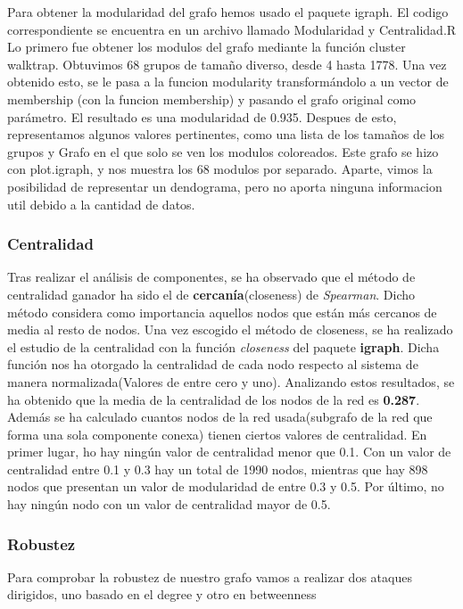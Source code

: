Para obtener la modularidad del grafo hemos usado el paquete igraph. El codigo correspondiente se encuentra en un archivo llamado Modularidad y Centralidad.R
Lo primero fue obtener los modulos del grafo mediante la función cluster walktrap. Obtuvimos 68 grupos de tamaño diverso, desde 4 hasta 1778. Una vez obtenido esto, se le pasa a la funcion modularity transformándolo a un vector de membership (con la funcion membership) y pasando el grafo original como parámetro. El resultado es una modularidad de 0.935.
Despues de esto, representamos algunos valores pertinentes, como una lista de los tamaños de los grupos y Grafo en el que solo se ven los modulos coloreados.
Este grafo se hizo con plot.igraph, y nos muestra los 68 modulos por separado.
Aparte, vimos la posibilidad de representar un dendograma, pero no aporta ninguna informacion util debido a la cantidad de datos.


\subsubsection{Centralidad}

Tras realizar el an\'alisis de componentes, se ha observado que el m\'etodo de centralidad ganador ha sido el de \textbf{cercan\'ia}(closeness) de \textit{Spearman}. Dicho método considera como importancia aquellos nodos que están más cercanos de media al resto de nodos.
Una vez escogido el m\'etodo de closeness, se ha realizado el estudio de la centralidad con la funci\'on \textit{closeness} del paquete \textbf{igraph}. Dicha funci\'on nos ha otorgado la centralidad de cada nodo respecto al sistema de manera normalizada(Valores de entre cero y uno).
Analizando estos resultados, se ha obtenido que la media de la centralidad de los nodos de la red es \textbf{0.287}.
Adem\'as se ha calculado cuantos nodos de la red usada(subgrafo de la red que forma una sola componente conexa) tienen ciertos valores de centralidad.
En primer lugar, ho hay ningún valor de centralidad menor que 0.1. Con un valor de centralidad entre 0.1 y 0.3 hay un total de 1990 nodos, mientras que hay 898 nodos que presentan un valor de modularidad de entre 0.3 y 0.5. Por último, no hay ningún nodo con un valor de centralidad mayor de 0.5.


\subsubsection{Robustez}

Para comprobar la robustez de nuestro grafo vamos a realizar dos ataques dirigidos, uno basado en el degree y otro en betweenness

